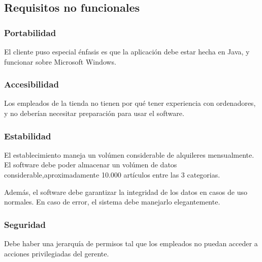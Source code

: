 \subsection{Requisitos no funcionales}
\subsubsection{Portabilidad}
El cliente puso especial énfasis es que la aplicación debe estar hecha en Java\texttrademark, y funcionar sobre Microsoft Windows\texttrademark.

\subsubsection{Accesibilidad}
Los empleados de la tienda no tienen por qué tener experiencia con ordenadores, y no deberían necesitar preparación para usar el software.

\subsubsection{Estabilidad}
El establecimiento maneja un volúmen considerable de alquileres mensualmente. El software debe poder almacenar un volúmen de datos considerable,aproximadamente 10.000 artículos entre las 3 categorias.

Además, el software debe garantizar la integridad de los datos en casos de uso normales.
En caso de error, el sistema debe manejarlo elegantemente.


\subsubsection{Seguridad}
Debe haber una jerarquía de permisos tal que los empleados no puedan acceder a acciones privilegiadas del gerente.
